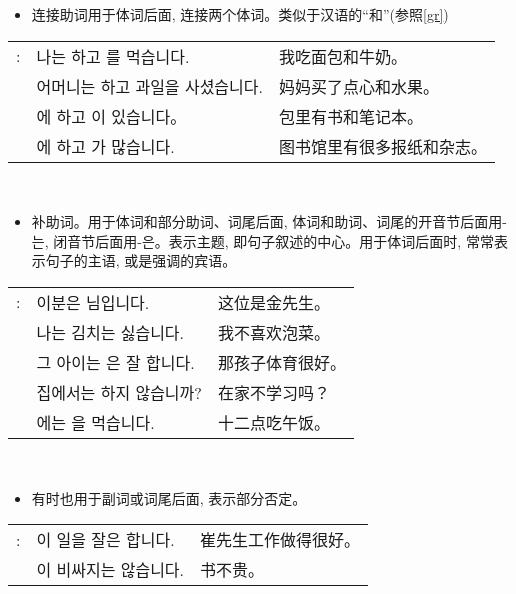 \begin{grammar}
    \begin{grammarsect}[\kr -하고]
    \begin{itemize}
        \item 连接助词用于体词后面, 连接两个体词。类似于汉语的“和”(参照\ref{gr})
    \end{itemize}
    \begin{tabular}{lll}
        \kr \ruby{例}{예}: &\kr 나는 \ruby{빵}{pão}하고 \ruby{牛乳}{우유}를 먹습니다.&我吃面包和牛奶。 \\
        &\kr 어머니는 \ruby{菓子}{과자}하고 과일을 사셨습니다. &妈妈买了点心和水果。\\ 
        &\kr \ruby{가방}{かばん}에 \ruby{冊}{책}하고 \ruby{空冊}{공책}이 있습니다。&包里有书和笔记本。\\
        &\kr \ruby{圖書館}{도서관}에 \ruby{新聞}{신문}하고 \ruby{雜誌}{잡지}가 많습니다.&图书馆里有很多报纸和杂志。\\
    \end{tabular}\\
    \end{grammarsect}
    \begin{grammarsect}[\kr -은 / -는]
        \begin{itemize}
            \item 补助词。用于体词和部分助词、词尾后面, 体词和助词、词尾的开音节后面用{\kr -는}, 闭音节后面用{\kr -은}。表示主题, 即句子叙述的中心。用于体词后面时, 常常表示句子的主语, 或是强调的宾语。
        \end{itemize}
        \begin{tabular}{lll}
            \kr \ruby{例}{예}: &\kr 이분은 \ruby{金}{김} \ruby{先生}{선생}님입니다.&这位是金先生。\\
            &\kr 나는 김치는 싫습니다.&我不喜欢泡菜。\\
            &\kr 그 아이는 \ruby{運動}{운동}은 잘 합니다.&那孩子体育很好。\\
            &\kr 집에서는 \ruby{工夫}{공부}하지 않습니까?&在家不学习吗？\\
            &\kr \ruby{ / 2}{열두}\ruby{時}{시}에는 \ruby{點心}{점심}을 먹습니다.&十二点吃午饭。
        \end{tabular}\\
        \begin{itemize}
            \item 有时也用于副词或词尾后面, 表示部分否定。
        \end{itemize}
        \begin{tabular}{lll}
            \kr \ruby{例}{예}: &\kr \ruby{崔}{최} \ruby{先生}{선생}이 일을 잘은 합니다.&崔先生工作做得很好。\\
            &\kr \ruby{冊}{책}이 비싸지는 않습니다.&书不贵。
        \end{tabular}\\
    \end{grammarsect}
\end{grammar}

